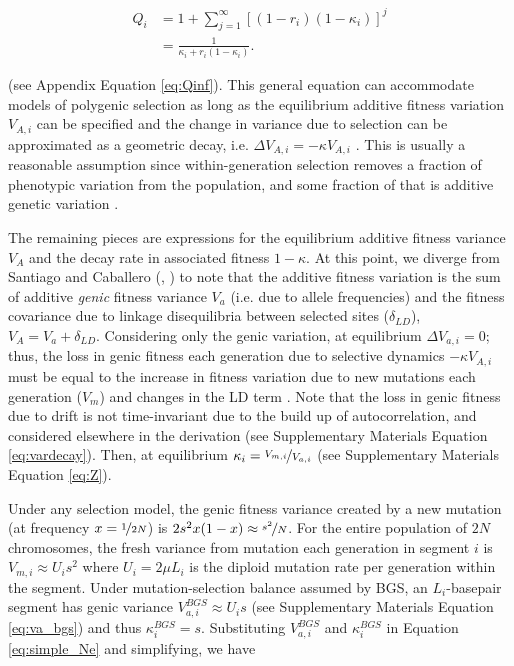 \documentclass[11pt]{article}
\begin{document}
\begin{align}
    Q_i &= 1 + \sum_{j=1}^\infty \left[(1-r_i)(1-\kappa_i)\right]^j \\
        &= \frac{1}{\kappa_i + r_i(1-\kappa_i)}.
\end{align}

(see Appendix Equation \ref{eq:Qinf}). This general equation can accommodate
models of polygenic selection as long as the equilibrium additive fitness
variation $V_{A,i}$ can be specified and the change in variance due to
selection can be approximated as a geometric decay, i.e. $\Delta V_{A,i} =
-\kappa V_{A,i}$ \parencite{Bulmer1971-ae,Keightley1988-eq,Walsh2018-bt}. This
is usually a reasonable assumption since within-generation selection removes a
fraction of phenotypic variation from the population, and some fraction of that
is additive genetic variation \parencite{Bulmer1971-ae,Keightley1988-eq}.

The remaining pieces are expressions for the equilibrium additive fitness
variance $V_A$ and the decay rate in associated fitness $1-\kappa$. At this
point, we diverge from Santiago and Caballero (\citeyear{Santiago1998-bs},
\citeyear{Santiago2016-mu}) to note that the additive fitness variation is the
sum of additive \emph{genic} fitness variance $V_a$ (i.e. due to allele
frequencies) and the fitness covariance due to linkage disequilibria between
selected sites ($\delta_{LD}$), $V_A = V_a + \delta_{LD}$. Considering only the
genic variation, at equilibrium $\Delta V_{a,i} = 0$; thus, the loss in genic
fitness each generation due to selective dynamics $-\kappa V_{A,i}$ must be
equal to the increase in fitness variation due to new mutations each generation
($V_m$) and changes in the LD term \parencite{Bulmer1971-ae}. Note that the
loss in genic fitness due to drift is not time-invariant due to the build up of
autocorrelation, and considered elsewhere in the derivation (see Supplementary
Materials Equation \ref{eq:vardecay}). Then, at equilibrium $\kappa_i =
\nicefrac{V_{m,i}}{V_{a,i}}$ (see Supplementary Materials Equation \ref{eq:Z}). 

Under any selection model, the genic fitness variance created by a new mutation
(at frequency $x=\nicefrac{1}{2N}$) is $2s^2 x(1-x) \approx \nicefrac{s^2}{N}$.
For the entire population of $2N$ chromosomes, the fresh variance from mutation
each generation in segment $i$ is $V_{m,i} \approx U_is^2$ where $U_i = 2\mu
L_i$ is the diploid mutation rate per generation within the segment. Under
mutation-selection balance assumed by BGS, an $L_i$-basepair segment has genic
variance $V_{a,i}^{BGS} \approx U_i s$ (see Supplementary Materials Equation
\ref{eq:va_bgs}) and thus $\kappa_i^{BGS} = s$. Substituting $V_{a,i}^{BGS}$
and $\kappa_i^{BGS}$ in Equation \eqref{eq:simple_Ne} and simplifying, we have
\end{document}
